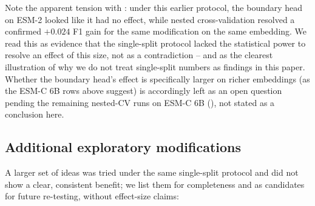 \documentclass{article}
\begin{document}
Note the apparent tension with : under this earlier protocol, the boundary head on ESM-2 looked like it had no effect, while nested cross-validation resolved a confirmed $+0.024$ F1 gain for the same modification on the same embedding. We read this as evidence that the single-split protocol lacked the statistical power to resolve an effect of this size, not as a contradiction -- and as the clearest illustration of why we do not treat single-split numbers as findings in this paper. Whether the boundary head's effect is specifically larger on richer embeddings (as the ESM-C 6B rows above suggest) is accordingly left as an open question pending the remaining nested-CV runs on ESM-C 6B (), not stated as a conclusion here.

\subsection{Additional exploratory modifications}

A larger set of ideas was tried under the same single-split protocol and did not show a clear, consistent benefit; we list them for completeness and as candidates for future re-testing, without effect-size claims:
\end{document}

